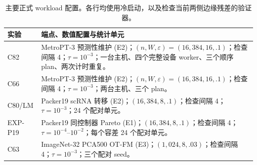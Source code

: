 \begin{table}[t]
\centering
\caption{主要正式 workload 配置。各行均使用冷启动，以及检查当前两侧边缘残差的验证器。}
\label{tab:workload-configs}
\scriptsize
\setlength{\tabcolsep}{3pt}
\begin{tabular}{@{}p{}p{}@{}}
\toprule
实验 & 端点、数值配置与统计单元 \\
\midrule
C82 & MetroPT-3 预测性维护 (E2)；$(n,W,\varepsilon)=(16{,}384,16,.1)$；检查间隔 4；$\tau=10^{-3}$；一台主机、四个完整设备 worker、三个顺序 plan、两次计时重复。 \\
C66 & MetroPT-3 预测性维护 (E2)；$(n,W,\varepsilon)=(16{,}384,16,.1)$；检查间隔 4；$\tau=10^{-3}$；两台主机、三个 plan。 \\
C80/LM & Packer19 scRNA 转移 (E2)；$(16{,}384,8,.1)$；检查间隔 4；$\tau=10^{-3}$；24 个配对单元。 \\
EXP-P19 & Packer19 同控制器 Pareto (E1)；$(16{,}384,8,.1)$；检查间隔 4；$\tau=10^{-4}\text{--}10^{-2}$；每个容差 24 个配对单元。 \\
C63 & ImageNet-32 PCA500 OT-FM (E3)；$(1{,}024,8,.03)$；检查间隔 4；$\tau=10^{-3}$；三个配对 seed。 \\
\bottomrule
\end{tabular}
\end{table}
